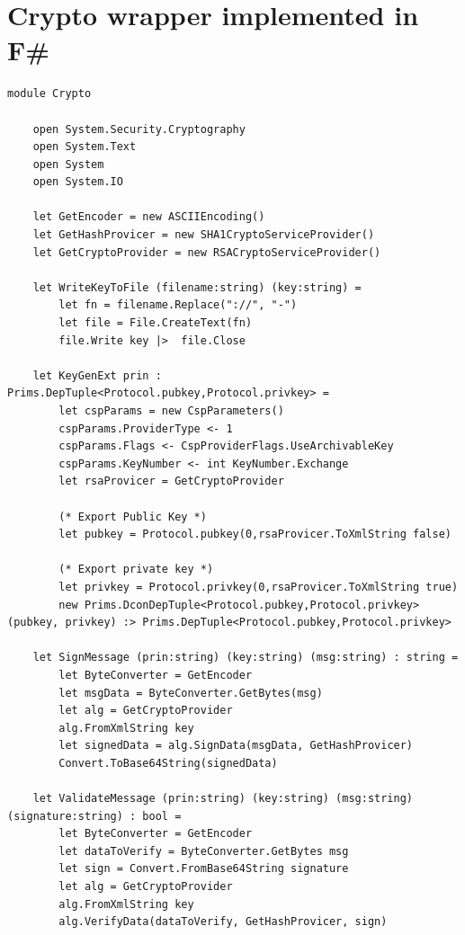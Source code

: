 \documentclass[twosided]{report}
\begin{document}
\section{Crypto wrapper implemented in F\#}
\begin{lstlisting}[style=fstar, caption={[Example of implementation of crypto functions in F\#]Example of implementation of crypto functions in F\# \cite{jacob}.}]
	module Crypto

	open System.Security.Cryptography
	open System.Text
	open System
	open System.IO
	
	let GetEncoder = new ASCIIEncoding()
	let GetHashProvicer = new SHA1CryptoServiceProvider()
	let GetCryptoProvider = new RSACryptoServiceProvider()
	
	let WriteKeyToFile (filename:string) (key:string) = 
		let fn = filename.Replace("://", "-")
		let file = File.CreateText(fn)
		file.Write key |>  file.Close
	
	let KeyGenExt prin : Prims.DepTuple<Protocol.pubkey,Protocol.privkey> = 
		let cspParams = new CspParameters()
		cspParams.ProviderType <- 1
		cspParams.Flags <- CspProviderFlags.UseArchivableKey
		cspParams.KeyNumber <- int KeyNumber.Exchange
		let rsaProvicer = GetCryptoProvider
	
		(* Export Public Key *)
		let pubkey = Protocol.pubkey(0,rsaProvicer.ToXmlString false)
	
		(* Export private key *)
		let privkey = Protocol.privkey(0,rsaProvicer.ToXmlString true)
		new Prims.DconDepTuple<Protocol.pubkey,Protocol.privkey>(pubkey, privkey) :> Prims.DepTuple<Protocol.pubkey,Protocol.privkey>
	
	let SignMessage (prin:string) (key:string) (msg:string) : string = 
		let ByteConverter = GetEncoder
		let msgData = ByteConverter.GetBytes(msg)
		let alg = GetCryptoProvider
		alg.FromXmlString key
		let signedData = alg.SignData(msgData, GetHashProvicer)
		Convert.ToBase64String(signedData)
	
	let ValidateMessage (prin:string) (key:string) (msg:string) (signature:string) : bool = 
		let ByteConverter = GetEncoder
		let dataToVerify = ByteConverter.GetBytes msg
		let sign = Convert.FromBase64String signature
		let alg = GetCryptoProvider
		alg.FromXmlString key
		alg.VerifyData(dataToVerify, GetHashProvicer, sign)
\end{lstlisting}
\clearpage
\end{document}

